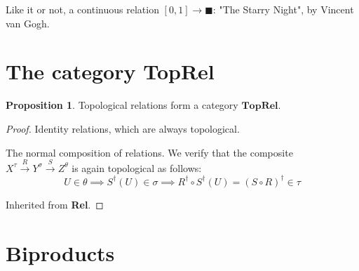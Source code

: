 \documentclass{tufte-handout}
\theoremstyle{definition}
\newtheorem{proposition}[theorem]{Proposition}
\begin{document}
\begin{marginfigure}
\centering
{}
\caption{Like it or not, a continuous relation $[0,1] \rightarrow \blacksquare$: "The Starry Night", by Vincent van Gogh.}
\end{marginfigure}

\section{The category \textbf{TopRel}}

\begin{proposition}
Topological relations form a category $\mathbf{TopRel}$.
\begin{proof}
 Identity relations, which are always topological.

 The normal composition of relations. We verify that the composite $X^\tau \overset{R}{\rightarrow} Y^\sigma \overset{S}{\rightarrow} Z^\theta$ is again topological as follows:
\[U \in \theta \implies S^\dag(U) \in \sigma \implies R^\dag \circ S^\dag(U) = (S \circ R)^\dag \in \tau\]

 Inherited from \textbf{Rel}.
\end{proof}
\end{proposition}

\section{Biproducts}
\end{document}
